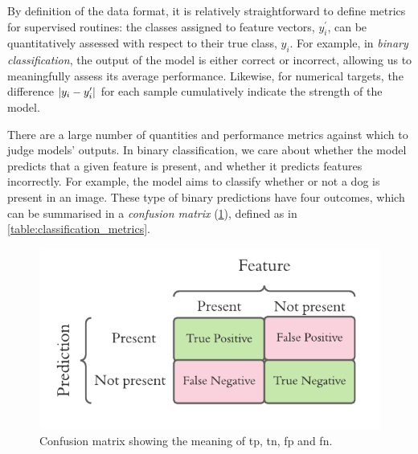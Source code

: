 By definition of the data format, it is relatively straightforward to define metrics for supervised routines:
    the classes assigned to feature vectors, $y_i^{\prime}$, can be quantitatively assessed with respect to their true class, $y_i$. 
For example, in \emph{binary classification}, the output of the model is either correct or incorrect, 
    allowing us to meaningfully assess its average performance. 
Likewise, for numerical targets, the difference $\left\lvert y_i - y_i^{\prime} \right\rvert$ 
    for each sample cumulatively indicate the strength of the model. 
\par 



There are a large number of quantities and performance metrics against which to judge models' outputs.
In binary classification, we care about whether the model predicts that a given feature is present,
    and whether it predicts features incorrectly. 
For example, the model aims to classify whether or not a dog is present in an image. 
These type of binary predictions have four outcomes, which can be summarised in a \emph{confusion matrix} (\cref{fig:confusion_matrix}), 
    defined as in \cref{table:classification_metrics}.
\begin{figure}[t]
    \begin{center}
        \includegraphics{contextual_review/figures/confusion_matrix.pdf}
    \end{center}
    \caption[Confusion matrix]{
        Confusion matrix showing the meaning of 
        \acrlong{tp}, \acrlong{tn}, \acrlong{fp} and \acrlong{fn}.
    }
    \label{fig:confusion_matrix}
\end{figure}
    
